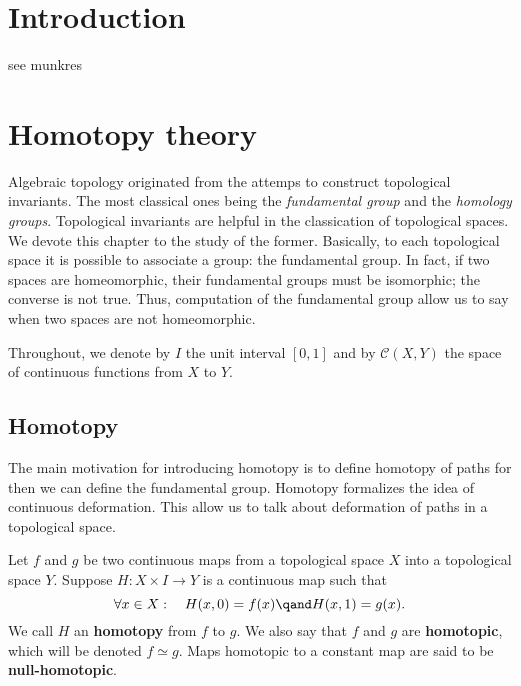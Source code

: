 \chapter{Introduction}


\begin{theorem}
    see munkres
\end{theorem}

\chapter{Homotopy theory}




Algebraic topology originated from the attemps to construct topological invariants. The most classical ones being the \textit{fundamental group} and the \textit{homology groups}. Topological invariants are helpful in the classication of topological spaces. We  devote this chapter  to the study of the former. Basically,  to each topological space it is possible to associate a group: the fundamental group. In fact, if two spaces are homeomorphic, their fundamental groups must be isomorphic; the converse is not true. Thus, computation of the fundamental group allow us to say when two spaces are not homeomorphic. 

Throughout, we denote  by \(I\) the unit interval \([0,1]\) and by \(\mathcal{C}(X,Y)\) the space of continuous functions from \(X\) to \(Y\).


\section{Homotopy}

The main motivation for introducing homotopy is to define homotopy of paths for then we can define the fundamental group.
Homotopy formalizes the idea of continuous deformation. 
This allow us to talk about deformation of paths in a topological space.


\begin{definition}[Homotopy]%
    Let \(f\) and \(g\) be two continuous maps from a topological space \(X\) into a topological space \(Y\). Suppose \(H \colon X\times I \to Y\) is a continuous map such that 
    \[
        \forall x\in X :\quad H(x,0) = f(x) \qand H(x,1) = g(x).
    \]
    We call \(H\) an \textbf{homotopy} from \(f\) to \(g\). We also say that \(f\) and \(g\) are \textbf{homotopic}, which will be denoted \(f\simeq g\). Maps homotopic to a constant map are said to be \textbf{null-homotopic}.
\end{definition}

